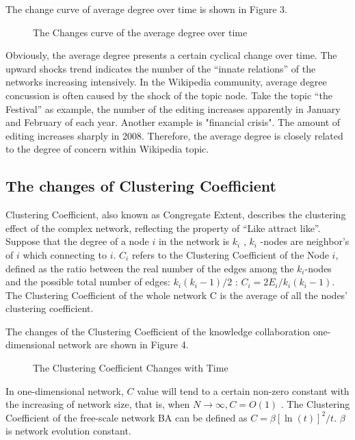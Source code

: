 \documentclass{elsarticle}
\begin{document}
The change curve of average degree over time is shown in Figure 3. 
\begin{figure}[htpb]
  \centering
  \scalebox{0.3}{\texttt{[image: 03]}}
  \caption{The Changes curve of the average degree over time}
\end{figure}
Obviously, the average degree presents a certain cyclical change over
time. The upward shocks trend indicates the number of the “innate
relations” of the  networks increasing intensively. In the Wikipedia
community, average degree concussion is often caused by the shock of
the topic node. Take the topic “the Festival” as example, the number
of the editing increases apparently in January and February of each
year. Another example is "financial crisis". The amount of editing  increases sharply in 2008. Therefore, the average degree is closely related to the degree of concern within Wikipedia topic.

\subsection{ The changes of Clustering Coefficient}
\label{sec:chang-clust-coeff}

Clustering Coefficient, also known as Congregate Extent, describes the
clustering effect of the complex network, reflecting the property
of “Like attract like”. Suppose that the degree of a node $i$ in the
network is $k_i$  , $k_i$ -nodes are neighbor's of $i$ which
connecting to $i$.  $C_i$  refers to the Clustering
Coefficient of the Node $i$,  defined as the ratio between the
real number of the edges among the $k_i$-nodes and the possible total
number of edges: $k_i(k_i-1)/2$ : $C_i=2E_i/k_i(k_i-1)$. The
Clustering Coefficient of the whole network C is the average of all
the nodes’ clustering coefficient.

The changes of the Clustering Coefficient of the knowledge
collaboration one-dimensional network are shown in Figure 4.
\begin{figure}[htpb]
  \centering
  \scalebox{0.3}{\texttt{[image: 04]}}
  \caption{ The Clustering Coefficient Changes with Time}
\end{figure}
 In one-dimensional network, $C$ value will tend to a certain non-zero
constant with the increasing of network size, that is, when
$N\rightarrow\infty,C=O(1)$ . The Clustering Coefficient of the
free-scale network BA can be defined as $C=\beta[\ln(t)]^2/t$. $\beta$
is network evolution constant.
\end{document}

